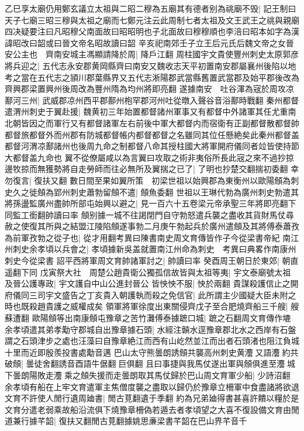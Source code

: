 乙巳享太廟仍用鄭玄議立太祖與二昭二穆為五廟其有德者别為祧廟不毁|{
	記王制曰天子七廟三昭三穆與太祖之廟而七鄭元注云此周制七者太祖及文王武王之祧與親廟四决疑要注曰凡昭穆父南面故曰昭昭明也子北面故曰穆穆順也李涪曰昭本如字為漢諱昭改曰韶或曰晉文帝名昭故讀曰韶}
辛亥祀南郊壬子立王后元氏后魏文帝之女晉安公主也　齊南安城主馮顯請降於周|{
	降戶江翻}
周柱國宇文貴使豐州刺史太原郭彦將兵迎之|{
	五代志永安郡黄岡縣齊曰南安又魏收志天平初置南安郡屬襄州後陷以地考之當在五代志之頴川郡葉縣界又五代志淅陽郡武當縣舊置武當郡及始平郡後改為齊興郡梁置興州後周改為豐州隋為均州將即亮翻}
遂據南安　吐谷渾為宼於周攻凉鄯河三州|{
	武威郡凉州西平郡鄯州枹罕郡河州吐從暾入聲谷音浴鄯時戰翻}
秦州都督遣渭州刺史于翼赴援|{
	魏黄初三年始置都督諸州軍事又有都督中外諸軍其任尤重南北朝皆因之而軍行又有都督諸軍左右前後中軍大都督内而宿衛有正副都督散都督帥都督旅都督外而州郡有防城都督帳内都督都督之名雖同其位任懸絶矣此秦州都督盖都督河渭凉鄯諸州也後周九命之制都督八命其授柱國大將軍開府儀同者竝皆使持節大都督盖九命也}
翼不從僚屬咸以為言翼曰攻取之術非夷俗所長此宼之來不過抄掠邊牧掠而無獲勢將自走勞師而往必無所及翼揣之已了|{
	了明也抄楚交翻揣初委翻}
幸勿復言|{
	復扶又翻}
數日間至果如翼所策　初梁世祖以始興郡為東衡州以歐陽頠為刺史久之徙頠為郢州刺史蕭勃留頠不遣|{
	頠魚委翻}
世祖以王琳代勃為廣州刺史勃遣其將孫盪監廣州盡帥所部屯始興以避之|{
	見一百六十五卷梁元帝承聖三年將即亮翻下同監工銜翻帥讀曰率}
頠别據一城不往謁閉門自守勃怒遣兵襲之盡收其貨財馬仗尋赦之使復其所與之結盟江陵陷頠遂事勃二月庚午勃起兵於廣州遣頠及其將傅泰蕭孜為前軍孜勃之從子也|{
	從才用翻考異曰陳書南史周文育傳皆作子今從梁書帝紀}
南江州刺史余孝頃以兵會之|{
	孝頃據新吳盖就置南江州命為刺史　考異曰典畧作南康州刺史今從梁書}
詔平西將軍周文育帥諸軍討之|{
	帥讀曰率}
癸酉周王朝日於東郊|{
	朝直遥翻下同}
戊寅祭大社　周楚公趙貴衛公獨孤信故皆與太祖等夷|{
	宇文泰廟號太祖}
及晉公護專政|{
	宇文護自中山公進封晉公}
皆怏怏不服|{
	怏於兩翻}
貴謀殺護信止之開府儀同三司宇文盛告之丁亥貴入朝護執而殺之免信官|{
	此所謂主少國疑大臣未附之時也既殺趙貴護之威權成矣}
領軍將軍徐度出東關侵齊戊子至合肥燒齊船三千艘|{
	艘蘇遭翻}
歐陽頠等出南康頠屯豫章之苦竹灘傅泰據蹠口城|{
	蹠之石翻周文育傳作塶}
余孝頃遣其弟孝勱守郡城自出豫章據石頭|{
	水經注贑水逕豫章郡北水之西岸有石盤謂之石頭津步之處也汪藻曰自豫章絶江而西有山屹然並江而出者石頭渚也阻江負城十里而近即殷羨投書處勱音邁}
巴山太守熊曇朗誘頠共襲高州刺史黄灋又語灋約共破頠|{
	曇徒舍翻誘音酉語牛倨翻巨俱翻}
且曰事捷與我馬仗遂出軍與頠俱進至灋城下曇朗陽敗走灋乘之頠失援而走曇朗取其馬仗歸於巴山周文育軍少船|{
	少詩沼翻}
余孝頃有船在上牢文育遣軍主焦僧度襲之盡取以歸仍於豫章立柵軍中食盡諸將欲退文育不許使人閒行遺周廸書|{
	閒古莧翻遺于季翻}
約為兄弟廸得書甚喜許饋以糧於是文育分遣老弱乘故船沿流俱下燒豫章柵偽若遁去者孝頃望之大喜不復設備文育由閒道兼行據芊韶|{
	復扶又翻閒古莧翻據姚思亷梁書芊韶在巴山界芊音千}
